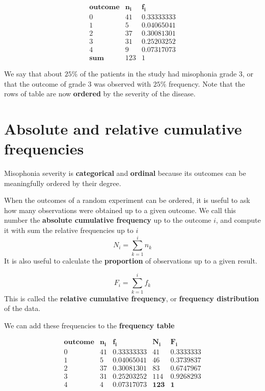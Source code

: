 \documentclass[
]{book}
\begin{document}
\[
\begin{array}{ccc}
\mathbf{outcome} & \mathbf{n_i} & \mathbf{f_i} \\
0   & 41    & 0.33333333  \\
1   & 5     & 0.04065041  \\
2   & 37    & 0.30081301  \\ 
3   & 31    & 0.25203252  \\
4   & 9     & 0.07317073  \\ \hline
\mathbf{sum} & 123 & 1
\end{array}
\]

We say that about \(25\%\) of the patients in the study had misophonia grade \(3\), or that the outcome of grade \(3\) was observed with \(25\%\) frequency. Note that the rows of table are now \textbf{ordered} by the severity of the disease.

\hypertarget{absolute-and-relative-cumulative-frequencies}{%
\section{Absolute and relative cumulative frequencies}\label{absolute-and-relative-cumulative-frequencies}}

Misophonia severity is \textbf{categorical} and \textbf{ordinal} because its outcomes can be meaningfully ordered by their degree.

When the outcomes of a random experiment can be ordered, it is useful to ask how many observations were obtained up to a given outcome. We call this number the \textbf{absolute cumulative frequency} up to the outcome \(i\), and compute it with sum the relative frequencies up to \(i\)
\[N_i =\sum_{k= 1}^i n_k\]
It is also useful to calculate the \textbf{proportion} of observations up to a given result.

\[F_i =\sum_{k= 1}^i f_k\]
This is called the \textbf{relative cumulative frequency}, or \textbf{frequency distribution} of the data.

We can add these frequencies to the \textbf{frequency table}

\[
\begin{array}{ccccc}
\mathbf{outcome} & \mathbf{n_i} & \mathbf{f_i} & \mathbf{N_i} & \mathbf{F_i}\\
0   & 41    & 0.33333333  & 41 & 0.3333333\\
1   & 5     & 0.04065041  & 46 & 0.3739837\\
2   & 37    & 0.30081301  & 83 & 0.6747967\\ 
3   & 31    & 0.25203252  & 114& 0.9268293\\
4   & 4     & 0.07317073  & \mathbf{123} & \mathbf{1}\\ \end{array}
\]
\end{document}
